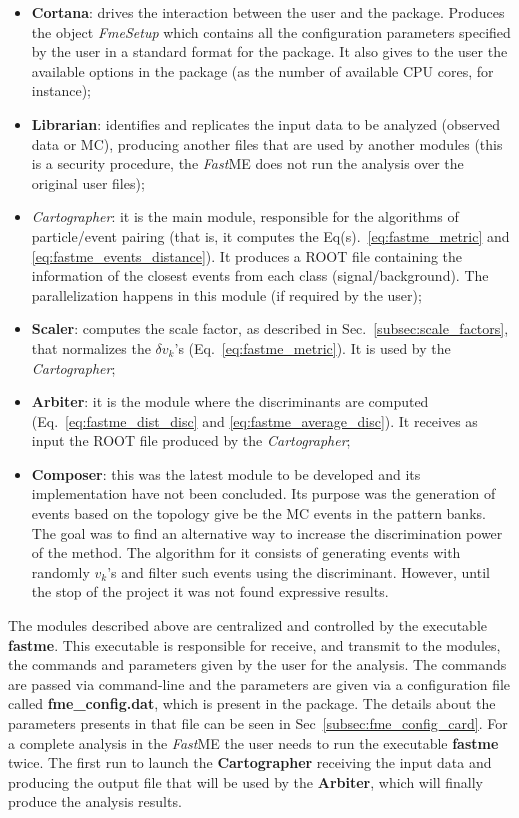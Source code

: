\begin{itemize}
	\item \textbf{Cortana}: drives the interaction between the user and the package. Produces the object \textit{FmeSetup} which contains all the configuration parameters specified by the user in a standard format for the package. It also gives to the user the available options in the package (as the number of available CPU cores, for instance);
	\item \textbf{Librarian}: identifies and replicates the input data to be analyzed (observed data or MC), producing another files that are used by another modules (this is a security procedure, the \textit{Fast}ME does not run the analysis over the original user files);
	\item \textit{Cartographer}: it is the main module, responsible for the algorithms of particle/event pairing (that is, it computes the Eq(s).~\ref{eq:fastme_metric} and \ref{eq:fastme_events_distance}). It produces a ROOT file containing the information of the closest events from each class (signal/background). The parallelization happens in this module (if required by the user);
	\item \textbf{Scaler}: computes the scale factor, as described in Sec.~\ref{subsec:scale_factors}, that normalizes the $\delta v_{k}$'s (Eq.~\ref{eq:fastme_metric}). It is used by the \textit{Cartographer};
	\item \textbf{Arbiter}: it is the module where the discriminants are computed (Eq.~\ref{eq:fastme_dist_disc} and \ref{eq:fastme_average_disc}). It receives as input the ROOT file produced by the \textit{Cartographer};
	\item \textbf{Composer}: this was the latest module to be developed and its implementation have not been concluded. Its purpose was the generation of events based on the topology give be the MC events in the pattern banks. The goal was to find an alternative way to increase the discrimination power of the method. The algorithm for it consists of generating events with randomly $v_{k}$'s and filter such events using the discriminant. However, until the stop of the project it was not found expressive results.
\end{itemize}

The modules described above are centralized and controlled by the executable \textbf{fastme}. This executable is responsible for receive, and transmit to the modules, the commands and parameters given by the user for the analysis. The commands are passed via command-line and the parameters are given via a configuration file called \textbf{fme\_config.dat}, which is present in the package. The details about the parameters presents in that file can be seen in Sec~\ref{subsec:fme_config_card}. For a complete analysis in the \textit{Fast}ME the user needs to run the executable \textbf{fastme} twice. The first run to launch the \textbf{Cartographer} receiving the input data and producing the output file that will be used by the \textbf{Arbiter}, which will finally produce the analysis results.


